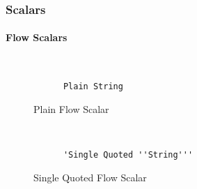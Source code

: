 \subsubsection{Scalars}

\paragraph{Flow Scalars}

\begin{figure}[H]
  \begin{minipage}[t]{0.48\textwidth}
    \vspace{0pt}
    \begin{bchart}[max=9, width=0.85\textwidth]
    \end{bchart}
  \end{minipage}
  \begin{minipage}[t]{0pt}~\end{minipage}
  \begin{minipage}[t]{0.48\textwidth}
    \vspace{0pt}
    \begin{verbatim}
      Plain String
    \end{verbatim}
  \end{minipage}
  \caption{Plain Flow Scalar}
\end{figure}

\begin{figure}[H]
  \begin{minipage}[t]{0.48\textwidth}
    \vspace{0pt}
    \begin{bchart}[max=9, width=0.85\textwidth]
    \end{bchart}
  \end{minipage}
  \begin{minipage}[t]{0pt}~\end{minipage}
  \begin{minipage}[t]{0.48\textwidth}
    \vspace{0pt}
    \begin{verbatim}
      'Single Quoted ''String'''
    \end{verbatim}
  \end{minipage}
  \caption{Single Quoted Flow Scalar}
\end{figure}

